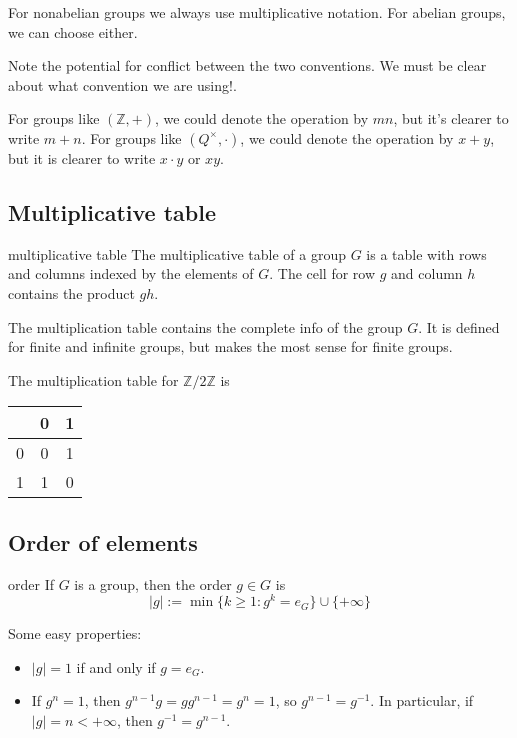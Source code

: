 For nonabelian groups we always use multiplicative notation. For abelian groups, we can choose either. 

Note the potential for conflict between the two conventions. We must be clear about what convention we are using!.

For groups like $(\mathbb Z,+)$, we could denote the operation by $mn$, but it's clearer to write $m+n$. For groups like $(Q^\times,\cdot)$, we could denote the operation by $x+y$, but it is clearer to write $x\cdot y$ or $xy$.

\subsection{Multiplicative table}
\begin{defn}{multiplicative table}
The multiplicative table of a group $G$ is a table with rows and columns indexed by the elements of $G$. The cell for row $g$ and column $h$ contains the product $gh$.
\end{defn}

The multiplication table contains the complete info of the group $G$. It is defined for finite and infinite groups, but makes the most sense for finite groups.

\begin{ex}
The multiplication table for $\mathbb Z/2\mathbb Z$ is 
\begin{center}
\begin{tabular}{c | c c}
& 0 & 1 \\\hline 
0 & 0 & 1\\
1 & 1 & 0
\end{tabular}
\end{center}
\end{ex}

\subsection{Order of elements}
\begin{defn}{order}
If $G$ is a group, then the order $g\in G$ is 
$$|g|:=\min\{k\ge 1: g^k=e_G\}\cup \{+\infty\}$$
\end{defn}

Some easy properties:
\begin{itemize}
\item $|g|=1$ if and only if $g=e_G$.
\item If $g^n=1$, then $g^{n-1}g=gg^{n-1}=g^n=1$, so $g^{n-1}=g^{-1}$. In particular, if $|g|=n<+\infty$, then $g^{-1}=g^{n-1}$.
\end{itemize}

